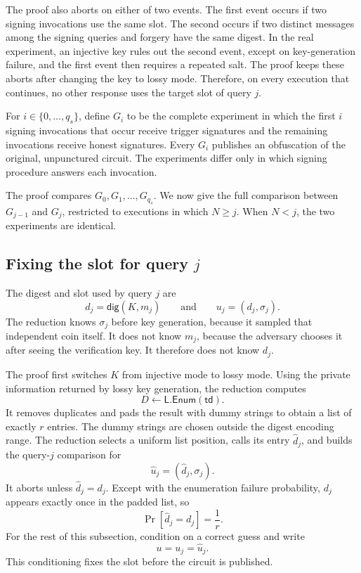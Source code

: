 \documentclass[11pt]{article}
\begin{document}
The proof also aborts on either of two events.  The first event occurs if two
signing invocations use the same slot.  The second occurs if two distinct
messages among the signing queries and forgery have the same digest.  In the
real experiment, an injective key rules out the second event, except on
key-generation failure, and the first event then requires a repeated salt.
The proof keeps these aborts after changing the key to lossy mode.  Therefore,
on every execution that continues, no other response uses the target slot
of query \(j\).

For \(i\in\{0,\ldots,q_s\}\), define \(G_i\) to be the complete experiment
in which the first \(i\) signing invocations that occur receive trigger
signatures and the remaining invocations receive honest signatures.  Every \(G_i\)
publishes an obfuscation of the original, unpunctured circuit.  The
experiments differ only in which signing procedure answers each invocation.

The proof compares \(G_0,G_1,\ldots,G_{q_s}\).  We now give the full
comparison between \(G_{j-1}\) and \(G_j\), restricted to executions in
which \(N\ge j\).  When \(N<j\), the two experiments are identical.

\subsection{Fixing the slot for query \texorpdfstring{\(j\)}{j}}

The digest and slot used by query \(j\) are
\[
  d_j=\mathsf{dig}(K,m_j)
  \qquad\text{and}\qquad
  u_j=(d_j,\sigma_j).
\]
The reduction knows \(\sigma_j\) before key generation, because it sampled
that independent coin itself.  It does not know \(m_j\), because the
adversary chooses it after seeing the verification key.  It therefore does
not know \(d_j\).

The proof first switches \(K\) from injective mode to lossy mode.  Using the
private information returned by lossy key generation, the reduction computes
\[
  D\gets\mathsf{L.Enum}(\mathsf{td}).
\]
It removes duplicates and pads the result with dummy strings to obtain a list
of exactly \(r\) entries.  The dummy strings are chosen outside the digest
encoding range.  The reduction selects a uniform list position, calls its
entry \(\widehat d_j\), and builds the query-\(j\) comparison for
\[
  \widehat u_j=(\widehat d_j,\sigma_j).
\]
It aborts unless \(\widehat d_j=d_j\).  Except with the enumeration failure
probability, \(d_j\) appears exactly once in the padded list, so
\[
  \Pr[\widehat d_j=d_j]=\frac1r.
\]
For the rest of this subsection, condition on a correct guess and write
\[
  u=u_j=\widehat u_j.
\]
This conditioning fixes the slot before the circuit is published.
\end{document}
